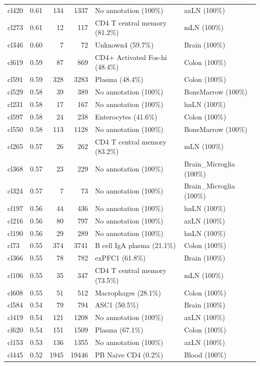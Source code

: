 \begin{table}[ht!]
\begin{tabular}{lrrrll}
  cl420 & 0.61 & 134 & 1337 & No annotation (100\%) & axLN (100\%) \\ 
  cl273 & 0.61 &  12 & 117 & CD4 T central memory (81.2\%) & mLN (100\%) \\ 
  cl346 & 0.60 &   7 &  72 & Unknown4 (59.7\%) & Brain (100\%) \\ 
  cl619 & 0.59 &  87 & 869 & CD4+ Activated Fos-hi (48.4\%) & Colon (100\%) \\ 
  cl591 & 0.59 & 328 & 3283 & Plasma (48.4\%) & Colon (100\%) \\ 
  cl529 & 0.58 &  39 & 389 & No annotation (100\%) & BoneMarrow (100\%) \\ 
  cl231 & 0.58 &  17 & 167 & No annotation (100\%) & hnLN (100\%) \\ 
  cl597 & 0.58 &  24 & 238 & Enterocytes (41.6\%) & Colon (100\%) \\ 
  cl550 & 0.58 & 113 & 1128 & No annotation (100\%) & BoneMarrow (100\%) \\ 
  cl265 & 0.57 &  26 & 262 & CD4 T central memory (83.2\%) & mLN (100\%) \\ 
  cl368 & 0.57 &  23 & 229 & No annotation (100\%) & Brain\_Microglia (100\%) \\ 
  cl324 & 0.57 &   7 &  73 & No annotation (100\%) & Brain\_Microglia (100\%) \\ 
  cl197 & 0.56 &  44 & 436 & No annotation (100\%) & hnLN (100\%) \\ 
  cl216 & 0.56 &  80 & 797 & No annotation (100\%) & axLN (100\%) \\ 
  cl190 & 0.56 &  29 & 289 & No annotation (100\%) & hnLN (100\%) \\ 
  cl73 & 0.55 & 374 & 3741 & B cell IgA plasma (21.1\%) & Colon (100\%) \\ 
  cl366 & 0.55 &  78 & 782 & exPFC1 (61.8\%) & Brain (100\%) \\ 
  cl106 & 0.55 &  35 & 347 & CD4 T central memory (73.5\%) & mLN (100\%) \\ 
  cl608 & 0.55 &  51 & 512 & Macrophages (28.1\%) & Colon (100\%) \\ 
  cl584 & 0.54 &  79 & 794 & ASC1 (50.5\%) & Brain (100\%) \\ 
  cl419 & 0.54 & 121 & 1208 & No annotation (100\%) & axLN (100\%) \\ 
  cl620 & 0.54 & 151 & 1509 & Plasma (67.1\%) & Colon (100\%) \\ 
  cl153 & 0.53 & 136 & 1355 & No annotation (100\%) & axLN (100\%) \\ 
  cl445 & 0.52 & 1945 & 19446 & PB Naive CD4  (0.2\%) & Blood (100\%) \\ 

\end{tabular}
\end{table}
